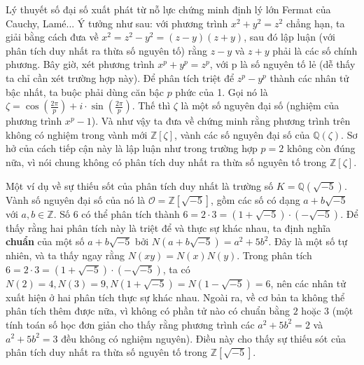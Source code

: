 \documentclass[12pt]{article}
\begin{document}
Lý thuyết số đại số xuất phát từ nỗ lực chứng minh định lý lớn Fermat của Cauchy, Lamé... Ý tưởng như sau: với phương trình $x^2 + y^2 = z^2$ chẳng hạn, ta giải bằng cách đưa về $x^2=z^2-y^2=(z-y)(z+y)$, sau đó lập luận (với phân tích duy nhất ra thừa số nguyên tố) rằng $z-y$ và $z+y$ phải là các số chính phương. Bây giờ, xét phương trình $x^p+y^p=z^p$, với p là số nguyên tố lẻ (dễ thấy ta chỉ cần xét trường hợp này). Để phân tích triệt để $z^p-y^p$ thành các nhân tử bậc nhất, ta buộc phải dùng căn bậc $p$ phức của 1. Gọi nó là $\zeta = \cos(\frac{2\pi}{p})+i \cdot \sin(\frac{2\pi}{p})$. Thế thì $\zeta$ là một số nguyên đại số (nghiệm của phương trình $x^p - 1$). Và như vậy ta đưa về chứng minh rằng phương trình trên không có nghiệm trong vành mới $\mathbb{Z}[\zeta]$, vành các số nguyên đại số của $\mathbb{Q}(\zeta)$. Sơ hở của cách tiếp cận này là lập luận như trong trường hợp $p=2$ không còn đúng nữa, vì nói chung không có phân tích duy nhất ra thừa số nguyên tố trong $\mathbb{Z}[\zeta]$.

Một ví dụ về sự thiếu sốt của phân tích duy nhất là trường số $K = \mathbb{Q}(\sqrt{-5})$. Vành số nguyên đại số của nó là $\mathcal{O} = \mathbb{Z}[\sqrt{-5}]$, gồm các số có dạng $a+b\sqrt{-5}$ với $a,b \in \mathbb{Z}$. Số $6$ có thể phân tích thành $6 = 2 \cdot 3 = (1+\sqrt{-5}) \cdot (-\sqrt{-5})$. Để thấy rằng hai phân tích này là triệt để và thực sự khác nhau, ta định nghĩa {\bf chuẩn} của một số $a+b\sqrt{-5}$ bởi $N(a+b\sqrt{-5}) = a^2 + 5b^2$. Đây là một số tự nhiên, và ta thấy ngay rằng $N(xy) = N(x)N(y)$. Trong phân tích $6 = 2 \cdot 3 = (1+\sqrt{-5}) \cdot (-\sqrt{-5})$, ta có $N(2) = 4, N(3) = 9, N(1+\sqrt{-5}) = N(1-\sqrt{-5}) = 6$, nên các nhân tử xuất hiện ở hai phân tích thực sự khác nhau.  Ngoài ra, về cơ bản ta không thể phân tích thêm được nữa, vì không có phần tử nào có chuẩn bằng $2$ hoặc $3$ (một tính toán số học đơn giản cho thấy rằng phương trình các $a^2 + 5b^2 = 2$ và $a^2 + 5b^2 = 3$ đều không có nghiệm nguyên). Điều này cho thấy sự thiếu sót của phân tích duy nhất ra thừa số nguyên tố trong $\mathbb{Z}[\sqrt{-5}]$.
\end{document}
